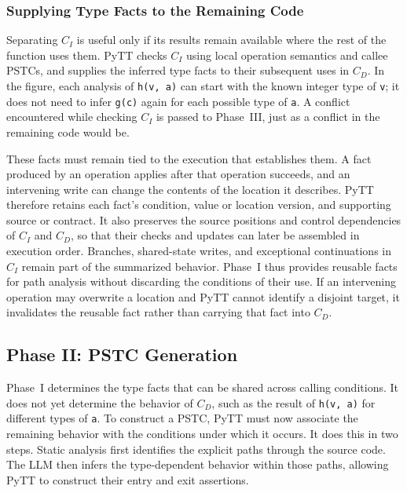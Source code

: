 \subsubsection{Supplying Type Facts to the Remaining Code}

Separating $C_I$ is useful only if its results remain available where
the rest of the function uses them. PyTT checks $C_I$ using local
operation semantics and callee PSTCs, and supplies the inferred type
facts to their subsequent uses in $C_D$. In the figure, each analysis of
\texttt{h(v, a)} can start with the known integer type of \texttt{v}; it
does not need to infer \texttt{g(c)} again for each possible type of
\texttt{a}. A conflict encountered while checking $C_I$ is passed to
Phase~III, just as a conflict in the remaining code would be.

These facts must remain tied to the execution that establishes them.
A fact produced by an operation applies after that operation succeeds,
and an intervening write can change the contents of the location it
describes. PyTT therefore retains each fact's condition, value or
location version, and supporting source or contract. It also preserves
the source positions and control dependencies of $C_I$ and $C_D$, so
that their checks and updates can later be assembled in execution order.
Branches, shared-state writes, and exceptional continuations in $C_I$
remain part of the summarized behavior. Phase~I thus provides reusable
facts for path analysis without discarding the conditions of their use.
If an intervening operation may overwrite a location and PyTT cannot
identify a disjoint target, it invalidates the reusable fact rather than
carrying that fact into $C_D$.

\subsection{Phase II: PSTC Generation}
\label{sec:pstc-generation}

Phase~I determines the type facts that can be shared across calling
conditions. It does not yet determine the behavior of $C_D$, such as the
result of \texttt{h(v, a)} for different types of \texttt{a}. To construct
a PSTC, PyTT must now associate the remaining behavior with the conditions
under which it occurs. It does this in two steps. Static analysis first
identifies the explicit paths through the source code. The LLM then
infers the type-dependent behavior within those paths, allowing PyTT to
construct their entry and exit assertions.

